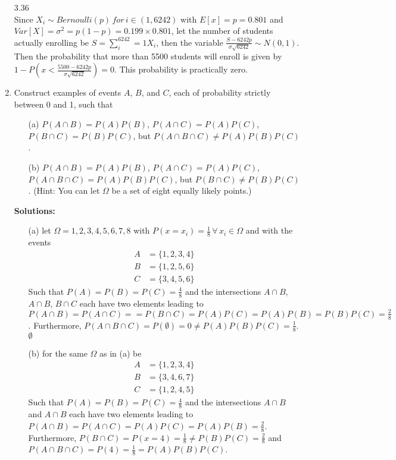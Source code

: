 \documentclass[letterpaper,12pt]{article}
\theoremstyle{definition}
\begin{document}
\begin{enumerate}
3.36\\
Since $X_i \sim Bernoulli(p)\, for \,  i \in (1, 6242)$ with $E[x]=p=0.801$ and $Var[X] = \sigma^2 =  p(1-p) = 0.199 \times 0.801$, let the number of students actually enrolling be $S = \sum^6242_i=1 X_i$, then the variable $\frac{S-6242p}{\sigma\sqrt{6242}} \sim N(0,1)$. Then the probability that more than 5500 students will enroll is given by $1-P(x < \frac{5500-6242p}{\sigma\sqrt{6242}}) = 0$. This probability is practically zero.
	\item Construct examples of events $A$, $B$, and $C$, each of probability strictly between 0 and 1, such that
   		\begin{itemize}
			\item[(a)] $P(A  \cap B) = P(A)P(B)$, $P(A  \cap C) = P(A)P(C)$, $P(B  \cap C) = P(B)P(C)$, but $P(A  \cap B \cap C) \neq P(A)P(B)P(C)$.
			\item[(b)] $P(A  \cap B) = P(A)P(B)$, $P(A  \cap C) = P(A)P(C)$, $P(A  \cap B \cap C) = P(A)P(B)P(C)$, but $P(B  \cap C) \neq P(B)P(C)$. (Hint: You can let $\Omega$ be a set of eight equally likely points.)
		\end{itemize}
		
\textbf{Solutions:}\\
\begin{itemize}
\item[(a)]  let $\Omega={1,2,3,4,5,6,7,8}$ with $P(x=x_i)=\frac{1}{8}\,  \forall \, x_i \in \Omega$ and with the events
\begin{align*}
A &= \lbrace 1, 2, 3, 4\rbrace \\
 B&=\lbrace1, 2, 5, 6 \rbrace \\
 C&=\lbrace 3, 4, 5, 6 \rbrace
\end{align*}
Such that $P(A)=P(B)=P(C)=\frac{4}{8}$ and the intersections $A  \cap B$, $A  \cap B$, $B \cap C $  each have two elements leading to  $P(A  \cap B) = P(A  \cap C) = =P(B \cap C )= P(A)P(C) = P(A)P(B) = P(B)P(C) = \frac{2}{8}$. Furthermore, $P(A  \cap B \cap C) = P(\emptyset) = 0 \neq P(A)P(B)P(C) = \frac{1}{8}$.
$\emptyset$
\item[(b)] for the same $\Omega$ as in (a) be 
\begin{align*}
A &= \lbrace 1, 2, 3, 4\rbrace \\
 B&=\lbrace3, 4, 6, 7 \rbrace \\
 C&=\lbrace 1, 2, 4, 5 \rbrace
\end{align*}
Such that $P(A)=P(B)=P(C)=\frac{4}{8}$ and the intersections $A  \cap B$ and $A  \cap B$  each have two elements leading to  $P(A  \cap B) = P(A  \cap C) = P(A)P(C) = P(A)P(B) = \frac{2}{8}$. Furthermore, $P(B  \cap C) = P(x=4) = \frac{1}{8}\neq P(B)P(C) = \frac{2}{8}$ and $P(A  \cap B \cap C) = P(4) = \frac{1}{8} = P(A)P(B)P(C)$.
\end{itemize}


\end{enumerate}
\end{document}
